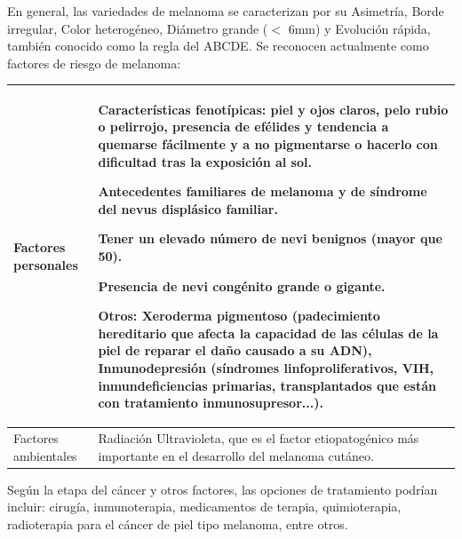 En general, las variedades de melanoma se caracterizan por su Asimetría, Borde irregular, Color heterogéneo, Diámetro grande ($<$ 6mm) y Evolución rápida, también conocido como la regla del ABCDE.
Se reconocen actualmente como factores de riesgo de melanoma: 


\begin{table}
\centering
\begin{tabular}{*{2}{p{.425\linewidth}}}
\midrule
Factores personales & 
Características fenotípicas: piel y ojos claros, pelo rubio o pelirrojo, presencia de efélides y tendencia a quemarse fácilmente y a no pigmentarse o hacerlo con dificultad tras la exposición al sol.

Antecedentes familiares de melanoma y de síndrome del nevus displásico familiar.

Tener un elevado número de nevi benignos (mayor que 50).

Presencia de nevi congénito grande o gigante.

Otros: Xeroderma pigmentoso (padecimiento hereditario que afecta la capacidad de las células de la piel de reparar el daño causado a su ADN), Inmunodepresión (síndromes linfoproliferativos, VIH, inmundeficiencias primarias, transplantados que están con tratamiento inmunosupresor...).\\

\midrule %

Factores ambientales & 
Radiación Ultravioleta, que es el factor etiopatogénico más importante en el desarrollo del melanoma cutáneo. \\
\bottomrule
\end{tabular}
\end{table}

Según la etapa del cáncer y otros factores, las opciones de tratamiento podrían incluir: cirugía, inmunoterapia, medicamentos de terapia, quimioterapia, radioterapia para el cáncer de piel tipo melanoma, entre otros.
